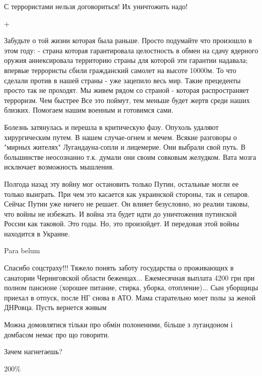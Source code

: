 \begin{itemize}
С террористами нельзя договориться! Их уничтожить надо!

+


Забудьте о той жизни которая была раньше. Просто подумайте что произошло в этом
году: - страна которая гарантировала целостность в обмен на сдачу ядерного
оружия аннексировала территорию страны для которой эти гарантии надавала;
впервые террористы сбили гражданский самолет на высоте 10000м. То что сделали
против в нашей страны - уже зацепило весь мир. Такие прецеденты просто так не
проходят. Мы живем рядом со страной - которая распространяет терроризм. Чем
быстрее Все это поймут, тем меньше будет жертв среди наших близких. Помогаем
нашим военным и готовимся сами.


Болезнь затянулась и перешла в критическую фазу. Опухоль удаляют хирургическим
путем. В нашем случае-огнем и мечем. Всякие разговоры о "мирных жителях"
Лугандауна-сопли и лицемерие. Они выбрали свой путь. В большинстве неосознанно
т.к. думали они своим совковым желудком. Вата мозга исключает возможность
мышления.


Полгода назад эту войну мог остановить только Путин, остальные могли ее только
выиграть. При чем это касается как украинской стороны, так и сепаров. Сейчас
Путин уже ничего не решает. Он влияет безусловно, но реалии таковы, что войны
не избежать. И война эта будет идти до уничтожения путинской России как
таковой. Это годы. Но, это произойдет. И передовая этой войны находится в
Украине.

Para belum


Спасибо соцстраху!!! Тяжело понять заботу государства о проживающих в санатории
Черниговской области беженцах... Ежемесячная выплата 4200 грн при полном
пансионе (хорошее питание, стирка, уборка, отопление)... Сын уборщицы приехал в
отпуск, после НГ снова в АТО. Мама старательно моет полы за женой ДНРовца.
Пусть вернется живым

Можна домовлятися тільки про обмін полоненими, більше з лугандоном і домбасом немає про що говорити.

Зачем нагнетаешь?

200\%



\end{itemize}
